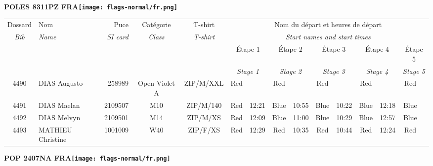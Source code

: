 \documentclass{report}
\begin{document}
\newpage
  \Huge \centering \bfseries POLES 8311PZ FRA\normalfont \footnotesize \sffamily \hfill \texttt{[image: flags-normal/fr.png]} \newline 
  \begin{longtable}{|c|l|r|c|c|*{5}{cc|}}
    Dossard & Nom  & Puce    & Catégorie & T-shirt & \multicolumn{10}{c|}{Nom du départ et heures de départ} \\
    \itshape Bib     & \itshape Name & \itshape SI card & \itshape Class  & \itshape  T-shirt  & \multicolumn{10}{c|}{\itshape Start names and start times} \\
    \hline
    & & & & & \multicolumn{2}{c|}{Étape 1} & \multicolumn{2}{c|}{Étape 2} & \multicolumn{2}{c|}{Étape 3} & \multicolumn{2}{c|}{Étape 4} & \multicolumn{2}{c|}{Étape 5} \\
    & & & & & \multicolumn{2}{c|}{\itshape Stage 1} & \multicolumn{2}{c|}{\itshape Stage 2} & \multicolumn{2}{c|}{\itshape Stage 3} & \multicolumn{2}{c|}{\itshape Stage 4} & \multicolumn{2}{c|}{\itshape Stage 5} \\
    \hline
    4490 & DIAS Augusto & 258989 & Open Violet A & ZIP/M/XXL & Red &   & Red &   & Red &   & Red &   & Red &  \\
    4491 & DIAS Maelan & 2109507 & M10 & ZIP/M/140 & Red & 12:21 & Blue & 10:55 & Blue & 10:22 & Blue & 12:18 & Blue &  \\
    4492 & DIAS Melvyn & 2109501 & M14 & ZIP/M/XS & Red & 12:09 & Blue & 11:00 & Blue & 10:29 & Blue & 12:57 & Blue &  \\
    4493 & MATHIEU Christine & 1001009 & W40 & ZIP/F/XS & Red & 12:29 & Red & 10:35 & Red & 10:44 & Red & 12:24 & Red &  \\
  \end{longtable}
\newpage
  \Huge \centering \bfseries POP 2407NA FRA\normalfont \footnotesize \sffamily \hfill \texttt{[image: flags-normal/fr.png]} \newline 
\end{document}
